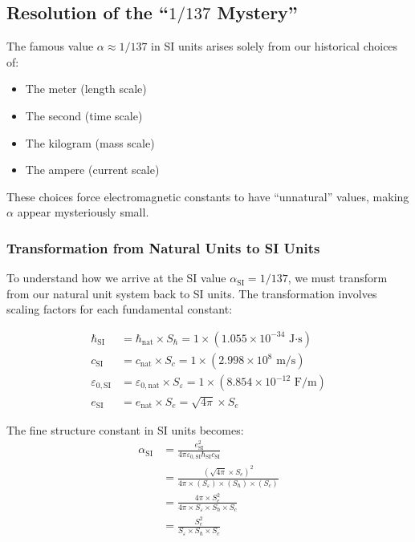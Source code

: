 \documentclass[12pt,a4paper]{article}
\begin{document}
	\subsection{Resolution of the ``$1/137$ Mystery''}
	
	The famous value $\alpha \approx 1/137$ in SI units arises solely from our historical choices of:
	\begin{itemize}
		\item The meter (length scale)
		\item The second (time scale)  
		\item The kilogram (mass scale)
		\item The ampere (current scale)
	\end{itemize}
	
	These choices force electromagnetic constants to have ``unnatural'' values, making $\alpha$ appear mysteriously small.
	
	\subsubsection{Transformation from Natural Units to SI Units}
	
	To understand how we arrive at the SI value $\alpha_{\text{SI}} = 1/137$, we must transform from our natural unit system back to SI units. The transformation involves scaling factors for each fundamental constant:
	
	\begin{align}
		\hbar_{\text{SI}} &= \hbar_{\text{nat}} \times S_{\hbar} = 1 \times (1.055 \times 10^{-34} \text{ J·s})\\
		c_{\text{SI}} &= c_{\text{nat}} \times S_c = 1 \times (2.998 \times 10^8 \text{ m/s})\\
		\varepsilon_{0,\text{SI}} &= \varepsilon_{0,\text{nat}} \times S_{\varepsilon} = 1 \times (8.854 \times 10^{-12} \text{ F/m})\\
		e_{\text{SI}} &= e_{\text{nat}} \times S_e = \sqrt{4\pi} \times S_e
	\end{align}
	
	The fine structure constant in SI units becomes:
	\begin{align}
		\alpha_{\text{SI}} &= \frac{e_{\text{SI}}^2}{4\pi\varepsilon_{0,\text{SI}}\hbar_{\text{SI}} c_{\text{SI}}}\\
		&= \frac{(\sqrt{4\pi} \times S_e)^2}{4\pi \times (S_{\varepsilon}) \times (S_{\hbar}) \times (S_c)}\\
		&= \frac{4\pi \times S_e^2}{4\pi \times S_{\varepsilon} \times S_{\hbar} \times S_c}\\
		&= \frac{S_e^2}{S_{\varepsilon} \times S_{\hbar} \times S_c}
	\end{align}
	
\end{document}
